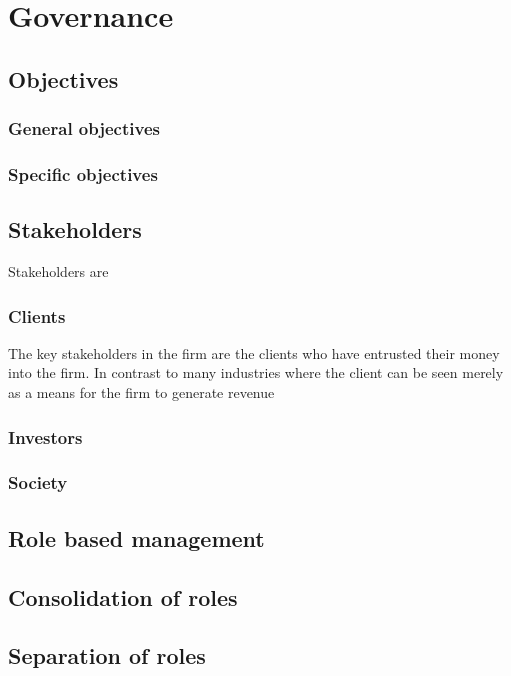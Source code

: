 \chapter{Governance}

\section{Objectives}

\subsection{General objectives}

\subsection{Specific objectives}

\section{Stakeholders}
Stakeholders are

\subsection{Clients}

The key stakeholders in the firm are the clients who have entrusted
their money into the firm.  In contrast to many industries where the
client can be seen merely as a means for the firm to generate revenue

\subsection{Investors}

\subsection{Society}

\section{Role based management}


\section{Consolidation of roles}

\section{Separation of roles}

